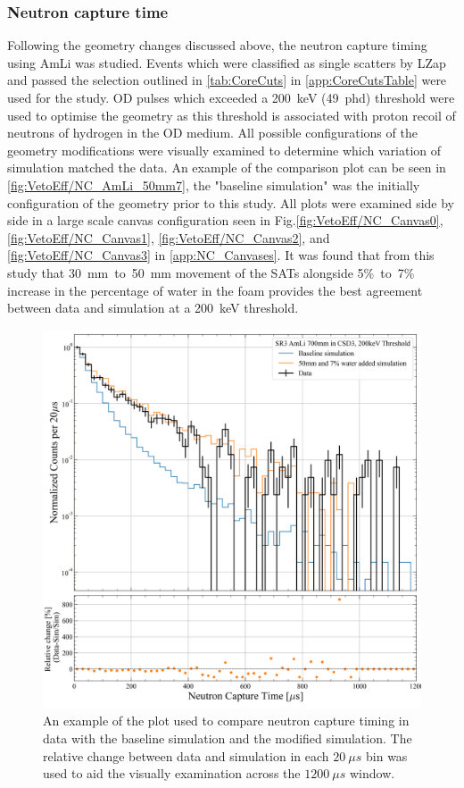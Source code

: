 \subsubsection{Neutron capture time}\label{sec:VetoEff/NCT}
Following the geometry changes discussed above, the neutron capture timing using AmLi was studied. Events which were classified as single scatters by LZap and passed the selection outlined in \autoref{tab:CoreCuts} in \autoref{app:CoreCutsTable} were used for the study. OD pulses which exceeded a 200~keV (49~phd) threshold were used to optimise the geometry as this threshold is associated with proton recoil of neutrons of hydrogen in the OD medium.
All possible configurations of the geometry modifications were visually examined to determine which variation of simulation matched the data. An example of the comparison plot can be seen in \autoref{fig:VetoEff/NC_AmLi_50mm7}, the "baseline simulation" was the initially configuration of the geometry prior to this study. All plots were examined side by side in a large scale canvas configuration seen in Fig.\ref{fig:VetoEff/NC_Canvas0}, \ref{fig:VetoEff/NC_Canvas1}, \ref{fig:VetoEff/NC_Canvas2}, and \ref{fig:VetoEff/NC_Canvas3} in \autoref{app:NC_Canvases}. It was found that from this study that 30~mm~to~50~mm movement of the SATs alongside 5\%~to~7\% increase in the percentage of water in the foam provides the best agreement between data and simulation at a 200~keV threshold.
\begin{figure}[!ht]
	\centering
	\includegraphics[width=0.7\linewidth]{figures/VetoEfficiency/movedSAT50mm_7percentWater_AmLi_CSD3_Z700mm_200keV_Ratio.png}
	\caption{An example of the plot used to compare neutron capture timing in data with the baseline simulation and the modified simulation. The relative change between data and simulation in each $20~\mu s$ bin was used to aid the visually examination across the $1200~\mu s$ window.}
	\label{fig:VetoEff/NC_AmLi_50mm7}
\end{figure}

